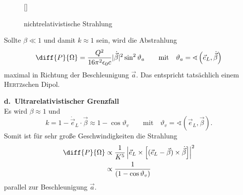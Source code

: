 \begin{wrapfigure}[11]{l}[0cm]{0cm}
	\raisebox{0pt}[\dimexpr{}\baselineskip\relax]{
		\colorbox{hgrey}{
		}
	}
	\caption{nichtrelativistische Strahlung}
\end{wrapfigure}
Sollte $\beta \ll 1$ und damit $k\approx 1$ sein, wird die Abstrahlung
\begin{equation*}
\diff{P}{\Omega}=\frac{Q^2}{16\pi^2\epsilon_0c}|\dot{\vec{\beta}}|^2\sin^2\vartheta_a\qquad\text{mit}\quad\vartheta_a=\sphericalangle\left(\vec{e}_L,\dot{\vec{\beta}}\right)
\end{equation*}
maximal in Richtung der Beschleunigung $\vec{a}$. Das entspricht tatsächlich einem \textsc{Hertz}schen Dipol.\\ \linebreak\linebreak\linebreak

\textbf{d.\ Ultrarelativistischer Grenzfall}\\

Es wird $\beta\approx 1$ und 
\begin{equation*}
k=1-\dot{\vec{e}}_L\cdot\vec{\beta}\approx 1-\cos\vartheta_v\qquad\text{mit}\quad\vartheta_v=\sphericalangle\left(\vec{e}_L,\vec{\beta}\right).
\end{equation*} 
Somit ist für sehr große Geschwindigkeiten die Strahlung
\begin{align*}
\diff{P}{\Omega}&\propto \frac{1}{K^5}\left|\vec{e}_L\times\left[(\vec{e}_L - \vec{\beta})\times\dot{\vec{\beta}}\right]\right|^2\\
& \propto \frac{1}{(1-\cos\vartheta_v)}
\end{align*}
parallel zur Beschleunigung $\vec{a}$.